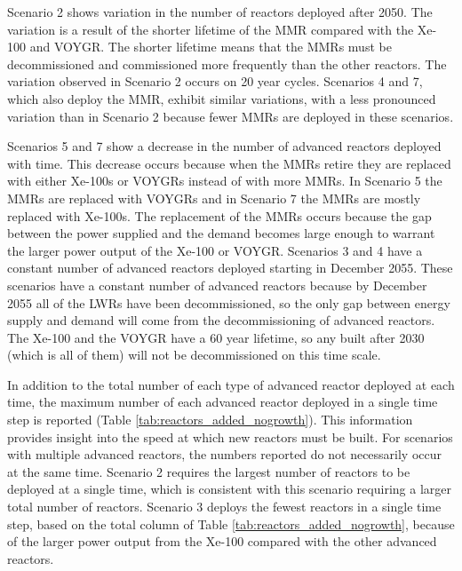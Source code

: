Scenario 2 shows variation in the number of reactors deployed 
after 2050. The variation is a result of the shorter lifetime of the 
\gls{MMR} compared with the Xe-100 and VOYGR. The shorter lifetime 
means that the \glspl{MMR} must be decommissioned and commissioned more 
frequently than the other reactors. The variation observed in Scenario 2 
occurs on 20 year cycles.  
Scenarios 4 and 7, which also deploy the \gls{MMR}, exhibit similar 
variations, with a less pronounced variation 
than in Scenario 2 because fewer 
\glspl{MMR} are deployed in these scenarios.

Scenarios 5 and 7 show a decrease in the number of advanced 
reactors deployed with time. This decrease occurs because when the 
\glspl{MMR} retire they are replaced with either Xe-100s or VOYGRs 
instead of with more \glspl{MMR}. In Scenario 5 the \glspl{MMR} are 
replaced with VOYGRs and in Scenario 7 the \glspl{MMR} are mostly 
replaced with Xe-100s. The replacement of the \glspl{MMR} occurs 
because the gap between the power supplied and the demand becomes 
large enough to warrant the larger power output of the Xe-100 or VOYGR.
Scenarios 3 and 4 have a constant number of advanced reactors deployed 
starting in December 2055. These scenarios have a constant number of 
advanced reactors because by December 2055 all of the \glspl{LWR} have 
been decommissioned, so the only gap between energy supply and demand 
will come from the decommissioning of advanced reactors. The Xe-100 and 
the VOYGR have a 60 year lifetime, so any built after 2030 (which is all 
of them) will not be decommissioned on this time scale. 

In addition to the total number of each type of advanced reactor deployed 
at each time, the maximum number of each advanced reactor deployed in a 
single time step is reported (Table 
\ref{tab:reactors_added_nogrowth}). This information provides insight 
into the speed at which new reactors must be built. For scenarios with 
multiple advanced reactors, the numbers reported do not necessarily occur 
at the same time. Scenario 2 requires 
the largest number of reactors to be deployed at a single time, which 
is consistent with this scenario requiring a larger total number of 
reactors. Scenario 3 deploys the fewest reactors in 
a single time step, based on the total column of Table 
\ref{tab:reactors_added_nogrowth}, because of the larger power output from 
the Xe-100 compared with the other advanced reactors. 

